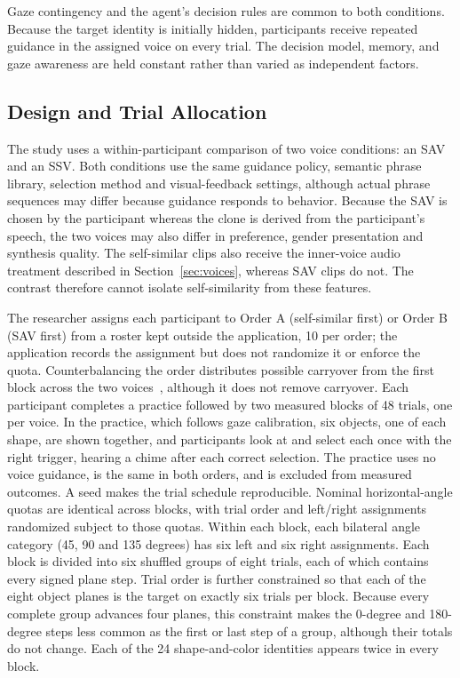 Gaze contingency and the agent's decision rules are common to both conditions. Because the target identity is initially hidden, participants receive repeated guidance in the assigned voice on every trial. The decision model, memory, and gaze awareness are held constant rather than varied as independent factors.

\subsection{Design and Trial Allocation}
The study uses a within-participant comparison of two voice conditions: an SAV and an SSV. Both conditions use the same guidance policy, semantic phrase library, selection method and visual-feedback settings, although actual phrase sequences may differ because guidance responds to behavior. Because the SAV is chosen by the participant whereas the clone is derived from the participant's speech, the two voices may also differ in preference, gender presentation and synthesis quality. The self-similar clips also receive the inner-voice audio treatment described in Section~\ref{sec:voices}, whereas SAV clips do not. The contrast therefore cannot isolate self-similarity from these features.

The researcher assigns each participant to Order A (self-similar first) or Order B (SAV first) from a roster kept outside the application, 10 per order; the application records the assignment but does not randomize it or enforce the quota. Counterbalancing the order distributes possible carryover from the first block across the two voices~\cite{williams1949residual}, although it does not remove carryover. Each participant completes a practice followed by two measured blocks of 48 trials, one per voice. In the practice, which follows gaze calibration, six objects, one of each shape, are shown together, and participants look at and select each once with the right trigger, hearing a chime after each correct selection. The practice uses no voice guidance, is the same in both orders, and is excluded from measured outcomes. A seed makes the trial schedule reproducible. Nominal horizontal-angle quotas are identical across blocks, with trial order and left/right assignments randomized subject to those quotas. Within each block, each bilateral angle category (45, 90 and 135 degrees) has six left and six right assignments. Each block is divided into six shuffled groups of eight trials, each of which contains every signed plane step. Trial order is further constrained so that each of the eight object planes is the target on exactly six trials per block. Because every complete group advances four planes, this constraint makes the 0-degree and 180-degree steps less common as the first or last step of a group, although their totals do not change. Each of the 24 shape-and-color identities appears twice in every block.


